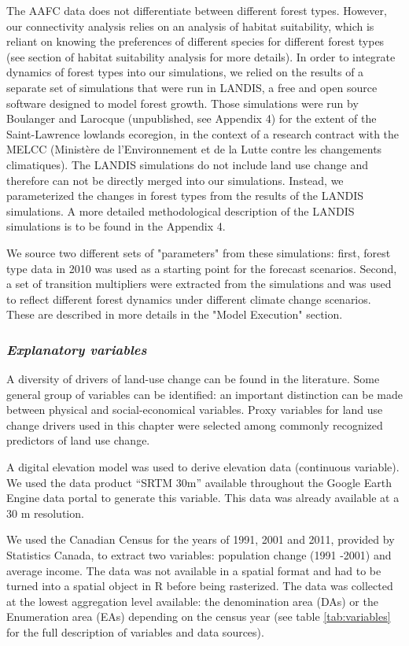 The AAFC data does not differentiate between different forest types. However, our connectivity analysis relies on an analysis of habitat suitability, which is reliant on knowing the preferences of different species for different forest types (see section of habitat suitability analysis for more details). In order to integrate dynamics of forest types into our simulations, we relied on the results of a separate set of simulations that were run in LANDIS, a free and open source software designed to model forest growth. Those simulations were run by Boulanger and Larocque (unpublished, see Appendix 4) for the extent of the Saint-Lawrence lowlands ecoregion, in the context of a research contract with the MELCC (Ministère de l'Environnement et de la Lutte contre les changements climatiques). The LANDIS simulations do not include land use change and therefore can not be directly merged into our simulations. Instead, we parameterized the changes in forest types from the results of the LANDIS simulations. A more detailed methodological description of the LANDIS simulations is to be found in the Appendix 4.

We source two different sets of "parameters" from these simulations: first, forest type data in 2010 was used as a starting point for the forecast scenarios. Second, a set of transition multipliers were extracted from the simulations and was used to reflect different forest dynamics under different climate change scenarios. These are described in more details in the "Model Execution" section.\\

\subsubsection*{\textit{Explanatory variables}}

A diversity of drivers of land-use change can be found in the literature. Some general group of variables can be identified: an important distinction can be made between physical and social-economical variables. Proxy variables for land use change drivers used in this chapter were selected among commonly recognized predictors of land use change.

A digital elevation model was used to derive elevation data (continuous variable). We used the data product “SRTM 30m” available throughout the Google Earth Engine data portal to generate this variable. This data was already available at a 30 m resolution.

We used the Canadian Census for the years of 1991, 2001 and 2011, provided by Statistics Canada, to extract two variables: population change (1991 -2001) and average income. The data was not available in a spatial format and had to be turned into a spatial object in R before being rasterized. The data was collected at the lowest aggregation level available: the denomination area (DAs) or the Enumeration area (EAs) depending on the census year (see table \ref{tab:variables} for the full description of variables and data sources).\\

